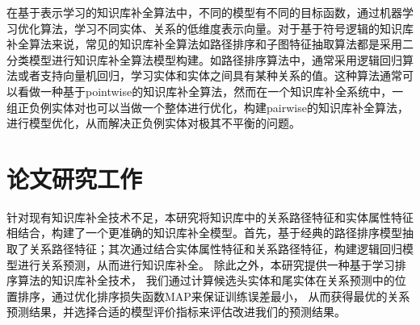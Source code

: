在基于表示学习的知识库补全算法中，不同的模型有不同的目标函数，通过机器学习优化算法，学习不同实体、关系的低维度表示向量。对于基于符号逻辑的知识库补全算法来说，常见的知识库补全算法如路径排序和子图特征抽取算法都是采用二分类模型进行知识库补全算法模型构建。如路径排序算法中，通常采用逻辑回归算法或者支持向量机回归，学习实体和实体之间具有某种关系的值。这种算法通常可以看做一种基于pointwise的知识库补全算法，然而在一个知识库补全系统中，一组正负例实体对也可以当做一个整体进行优化，构建pairwise的知识库补全算法，进行模型优化，从而解决正负例实体对极其不平衡的问题。

\section{论文研究工作}

针对现有知识库补全技术不足，本研究将知识库中的关系路径特征和实体属性特征相结合，构建了一个更准确的知识库补全模型。首先，基于经典的路径排序模型抽取了关系路径特征；其次通过结合实体属性特征和关系路径特征，构建逻辑回归模型进行关系预测，从而进行知识库补全。
除此之外，本研究提供一种基于学习排序算法的知识库补全技术，
我们通过计算候选头实体和尾实体在关系预测中的位置排序，通过优化排序损失函数MAP来保证训练误差最小，
从而获得最优的关系预测结果，并选择合适的模型评价指标来评估改进我们的预测结果。  

